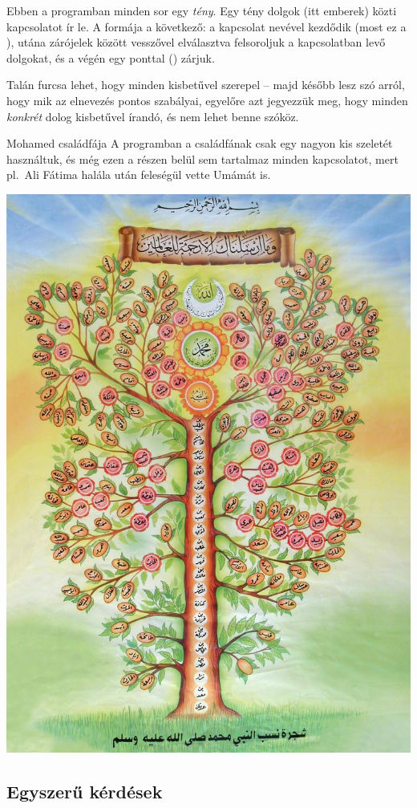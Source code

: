 Ebben a programban minden sor egy \emph{tény}. Egy
tény dolgok (itt emberek) közti kapcsolatot ír le. A
formája a következő: a kapcsolat nevével kezdődik
(most ez a ), utána zárójelek között
vesszővel elválasztva felsoroljuk a kapcsolatban
levő dolgokat, és a végén egy ponttal ()
zárjuk.

Talán furcsa lehet, hogy minden kisbetűvel szerepel --
majd később lesz szó arról, hogy mik az elnevezés
pontos szabályai, egyelőre azt jegyezzük meg, hogy
minden \emph{konkrét} dolog kisbetűvel írandó, és
nem lehet benne szóköz.

\begin{infobox}{}{Mohamed családfája}
A programban a családfának csak egy nagyon kis
szeletét használtuk, és még ezen a részen belül
sem tartalmaz minden kapcsolatot, mert pl.~Ali
Fátima halála után feleségül vette Umámát is.

\begin{center}
  \includegraphics[width=.75\textwidth]{images/prophet-family.jpg}
\end{center}
\end{infobox}

\subsection*{Egyszerű kérdések}

